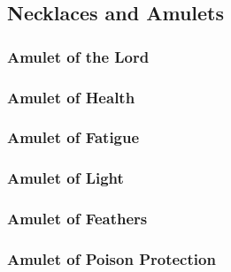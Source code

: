 \subsection{Necklaces and Amulets}

\subsubsection{Amulet of the Lord}

\subsubsection{Amulet of Health}

\subsubsection{Amulet of Fatigue}

\subsubsection{Amulet of Light}

\subsubsection{Amulet of Feathers}

\subsubsection{Amulet of Poison Protection}